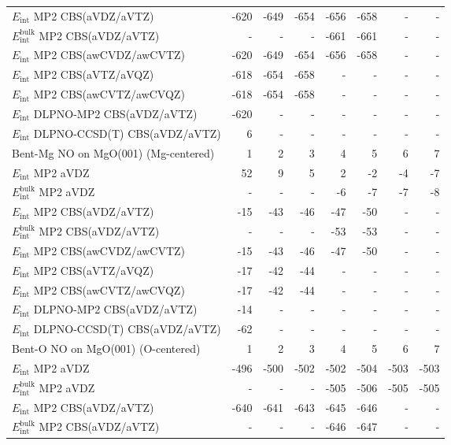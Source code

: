 \begin{longtable}{lrrrrrrr}
$E_\textrm{int}$ MP2 CBS(aVDZ/aVTZ) & -620 & -649 & -654 & -656 & -658 & - & - \\
$E_\textrm{int}^\textrm{bulk}$ MP2 CBS(aVDZ/aVTZ) & - & - & - & -661 & -661 & - & - \\
$E_\textrm{int}$ MP2 CBS(awCVDZ/awCVTZ) & -620 & -649 & -654 & -656 & -658 & - & - \\
$E_\textrm{int}$ MP2 CBS(aVTZ/aVQZ) & -618 & -654 & -658 & - & - & - & - \\
$E_\textrm{int}$ MP2 CBS(awCVTZ/awCVQZ) & -618 & -654 & -658 & - & - & - & - \\
$E_\textrm{int}$ DLPNO-MP2 CBS(aVDZ/aVTZ) & -620 & - & - & - & - & - & - \\
$E_\textrm{int}$ DLPNO-CCSD(T) CBS(aVDZ/aVTZ) & 6 & - & - & - & - & - & - \\
\toprule
Bent-Mg NO on MgO(001) (Mg-centered) & 1 & 2 & 3 & 4 & 5 & 6 & 7 \\ 
\midrule
$E_\textrm{int}$ MP2 aVDZ & 52 & 9 & 5 & 2 & -2 & -4 & -7 \\
$E_\textrm{int}^\textrm{bulk}$ MP2 aVDZ & - & - & - & -6 & -7 & -7 & -8 \\
$E_\textrm{int}$ MP2 CBS(aVDZ/aVTZ) & -15 & -43 & -46 & -47 & -50 & - & - \\
$E_\textrm{int}^\textrm{bulk}$ MP2 CBS(aVDZ/aVTZ) & - & - & - & -53 & -53 & - & - \\
$E_\textrm{int}$ MP2 CBS(awCVDZ/awCVTZ) & -15 & -43 & -46 & -47 & -50 & - & - \\
$E_\textrm{int}$ MP2 CBS(aVTZ/aVQZ) & -17 & -42 & -44 & - & - & - & - \\
$E_\textrm{int}$ MP2 CBS(awCVTZ/awCVQZ) & -17 & -42 & -44 & - & - & - & - \\
$E_\textrm{int}$ DLPNO-MP2 CBS(aVDZ/aVTZ) & -14 & - & - & - & - & - & - \\
$E_\textrm{int}$ DLPNO-CCSD(T) CBS(aVDZ/aVTZ) & -62 & - & - & - & - & - & - \\
\toprule
Bent-O NO on MgO(001) (O-centered) & 1 & 2 & 3 & 4 & 5 & 6 & 7 \\ 
\midrule
$E_\textrm{int}$ MP2 aVDZ & -496 & -500 & -502 & -502 & -504 & -503 & -503 \\
$E_\textrm{int}^\textrm{bulk}$ MP2 aVDZ & - & - & - & -505 & -506 & -505 & -505 \\
$E_\textrm{int}$ MP2 CBS(aVDZ/aVTZ) & -640 & -641 & -643 & -645 & -646 & - & - \\
$E_\textrm{int}^\textrm{bulk}$ MP2 CBS(aVDZ/aVTZ) & - & - & - & -646 & -647 & - & - \\

\end{longtable}
